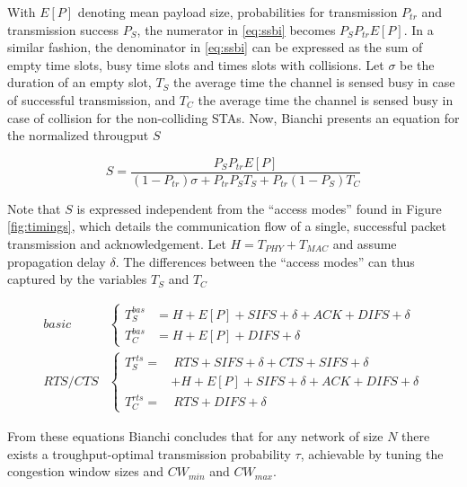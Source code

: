 With $E[P]$ denoting mean payload size, probabilities for transmission
$P_{tr}$ and transmission success $P_S$, the numerator in \ref{eq:ssbi}
becomes $P_S P_{tr} E[P]$. In a similar fashion, the denominator in
\ref{eq:ssbi} can be expressed as the sum of empty time slots, busy time slots
and times slots with collisions. Let $\sigma$ be the duration of an empty
slot, $T_{S}$ the average time the channel is sensed busy in case of
successful transmission, and $T_{C}$ the average time the channel is sensed
busy in case of collision for the non-colliding STAs. Now, Bianchi presents an
equation for the normalized througput $S$

\begin{equation} \label{eq:sbi}
	S = \frac{P_S P_{tr} E[P]}{(1-P_{tr})\sigma + P_{tr} P_S T_S + P_{tr} (1-P_S) T_C}
\end{equation}

Note that $S$ is expressed independent from the ``access modes'' found in
Figure \ref{fig:timings}, which details the communication flow of a single,
successful packet transmission and acknowledgement. Let $H = T_{\mathit{PHY}}
+ T_{\mathit{MAC}}$ and assume propagation delay $\delta$. The differences
between the ``access modes'' can thus captured by the variables $T_{S}$ and
$T_{C}$

\begin{align}  \label{eq:tbi}
	\mathit{basic} & \left\{
		\begin{aligned}
	        T^{bas}_{S} & = H + E[P] + \mathit{SIFS} + \delta + \mathit{ACK} + \mathit{DIFS} + \delta  \\
	        T^{bas}_{C} & = H + E[P] + \mathit{DIFS} + \delta
	    \end{aligned}
	\right. \\
	\mathit{RTS/CTS} & \left\{
	    \begin{aligned}
	        T^{rts}_{S} = & ~ \mathit{RTS} + \mathit{SIFS} + \delta + \mathit{CTS} + \mathit{SIFS} + \delta \\ & + H + E[P] + \mathit{SIFS} + \delta + \mathit{ACK} + \mathit{DIFS} + \delta  \\
	        T^{rts}_{C} = & ~ \mathit{RTS} + \mathit{DIFS} + \delta
	    \end{aligned}
	\right.
\end{align}


From these equations Bianchi concludes that for any network of size $N$ there
exists a troughput-optimal transmission probability $\tau$, achievable by
tuning the congestion window sizes and $\mathit{CW_{min}}$ and $\mathit{CW_{max}}$.

